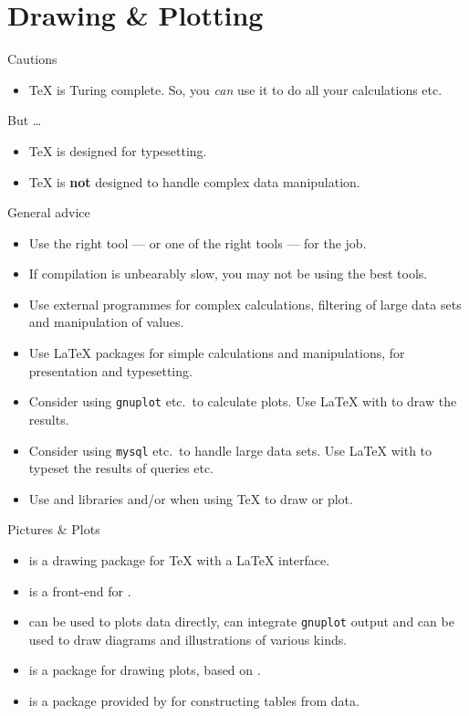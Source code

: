 \section{Drawing \& Plotting}

\begin{frame}{Cautions}
  \begin{itemize}
    \item \TeX{} is Turing complete.
    So, you \emph{can} use it to do all your calculations etc.
  \end{itemize}
  But \dots
  \begin{itemize}
    \item \TeX{} is designed for typesetting.
    \item \TeX{} is \textbf{not} designed to handle complex data manipulation.
  \end{itemize}
\end{frame}
\begin{frame}[fragile]{General advice}
  \begin{itemize}
    \item Use the right tool --- or one of the right tools --- for the job.
    \item If compilation is unbearably slow, you may not be using the best tools.
    \item Use external programmes for complex calculations, filtering of large data sets and manipulation of values.
    \item Use \LaTeX{} packages for simple calculations and manipulations, for presentation and typesetting.
    \item Consider using \verb|gnuplot| etc.\ to calculate plots.
    Use \LaTeX{} with \pgf{} to draw the results.
    \item Consider using \verb|mysql| etc.\ to handle large data sets.
    Use \LaTeX{} with  to typeset the results of queries etc.
    \item Use \Tikz{} and \pgfplots{}  libraries and/or  when using \TeX{} to draw or plot.
  \end{itemize}
\end{frame}
\begin{frame}[fragile]{Pictures \& Plots}
  \begin{itemize}
    \item \pgf{} is a drawing package for \TeX{} with a \LaTeX{} interface.
    \item \Tikz{} is a front-end for \pgf{}.
    \item \tikzpgf{} can be used to plots data directly, can integrate \verb|gnuplot| output and can be used to draw diagrams and illustrations of various kinds.
    \item \pgfplots{} is a package for drawing plots, based on \tikzpgf{}.
    \item \pgfplotstable{} is a package provided by \pgfplots{} for constructing tables from data.
  \end{itemize}
\end{frame}

